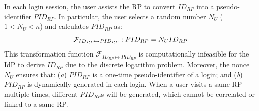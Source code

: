  In each login session, the user assists the RP to convert $ID_{RP}$ into a pseudo-identifier $PID_{RP}$. In particular, the user selects a random number $N_{U}$ ($1 < N_{U}<n$) and calculates $PID_{RP}$ as:
\begin{equation}
\setlength{\abovedisplayskip}{3pt}
\setlength{\belowdisplayskip}{3pt}
\mathcal{F}_{ID_{RP} \mapsto PID_{RP}}: PID_{RP} = {N_{U}}{ID_{RP}}
\label{equ:PIDRP}
\end{equation}
This transformation function $\mathcal{F}_{ID_{RP} \mapsto PID_{RP}}$ %
is computationally infeasible for the IdP to derive $ID_{RP}$%
due to the discrete logarithm problem.
Moreover, the nonce $N_{U}$ ensures that: (\emph{a}) $PID_{RP}$ is a one-time pseudo-identifier of a login;  
and (\emph{b}) $PID_{RP}$ is dynamically generated in each login. 
When a user visits a same RP multiple times, different $PID_{RP}$s will be generated, which cannot be correlated or linked to a same RP.





